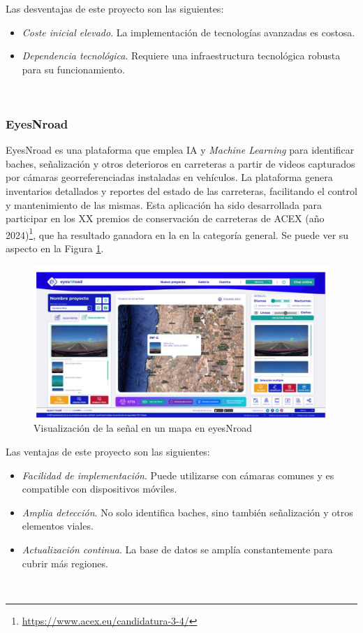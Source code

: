 Las desventajas de este proyecto son las siguientes:
\begin{itemize}
	\item \textit{Coste inicial elevado}. La implementación de tecnologías avanzadas es costosa.
	\item \textit{Dependencia tecnológica}. Requiere una infraestructura tecnológica robusta para su funcionamiento.
\end{itemize}\


\subsubsection{EyesNroad}

EyesNroad es una plataforma que emplea \ac{IA} y \textit{Machine Learning} para identificar baches, señalización y otros deterioros en carreteras a partir de videos capturados por cámaras georreferenciadas instaladas en vehículos. La plataforma genera inventarios detallados y reportes del estado de las carreteras, facilitando el control y mantenimiento de las mismas. Esta aplicación ha sido desarrollada para participar en los XX premios de conservación de carreteras de \ac{ACEX} (año 2024)\footnote{\url{https://www.acex.eu/candidatura-3-4/}}, que ha resultado ganadora en la en la categoría general. Se puede ver su aspecto en la Figura \ref{fig:enr}.

\begin{figure} [h!]
	\begin{center}
		\includegraphics[width=16cm]{figs/enr.png}
	\end{center}
	\caption{Visualización de la señal en un mapa en eyesNroad}
	\label{fig:enr}
\end{figure}


Las ventajas de este proyecto son las siguientes:

\begin{itemize}
	\item \textit{Facilidad de implementación}. Puede utilizarse con cámaras comunes y es compatible con dispositivos móviles.
	\item \textit{Amplia detección}. No solo identifica baches, sino también señalización y otros elementos viales.
	\item \textit{Actualización continua}. La base de datos se amplía constantemente para cubrir más regiones.
	
\end{itemize}\

